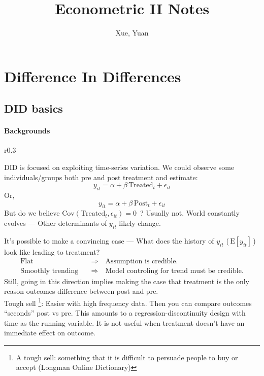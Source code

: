 \documentclass[a4paper,11pt]{article}
\author{Xue, Yuan}
\title{Econometric II Notes}
\newcommand{\myparagraph}[1]{\paragraph{#1}\mbox{}\par}
\newcommand{\E}{\mathrm{E}}
\newcommand{\Cov}{\mathrm{Cov}}
\begin{document}
\maketitle
\tableofcontents
\section{Difference In Differences}
\subsection{DID basics}
\myparagraph{Backgrounds}
\begin{wrapfigure}{r}{0.3\textwidth}
\label{trend}
\end{wrapfigure}
DID is focused on exploiting time-series variation. We could observe some individuals/groups both pre and post treatment and estimate:
\begin{equation}
	y_{it}=\alpha + \beta\,\text{Treated}_t + \epsilon_{it}
\end{equation}
Or,
\begin{equation}
	y_{it}=\alpha + \beta\,\text{Post}_t + \epsilon_{it}
\end{equation}
But do we believe $\Cov (\mathrm{Treated}_t,\epsilon_{it}) = 0$~? Usually not. World constantly evolves --- Other determinants of $y_{it}$ likely change.

It's possible to make a convincing case --- What does the history of $y_{it}$ (\,$\E[y_{it}]$\,) look like leading to treatment?
\begin{align}
	\text{Flat} \quad & \Rightarrow \quad \text{Assumption is credible.} \nonumber \\
	\text{Smoothly trending} \quad & \Rightarrow \quad \text{Model controling for trend must be credible.} \nonumber
\end{align}
Still, going in this direction implies making the case that treatment is the only reason outcomes difference between post and pre.\\
Tough sell
\footnote{A tough sell: something that it is difficult to persuade people to buy or accept (Longman Online Dictionary)}: 
Easier with high frequency data. Then you can compare outcomes ``seconds'' post vs pre. This amounts to a regression-discontinuity design with time as the running variable. It is not useful when treatment doesn't have an immediate effect on outcome.
\end{document}
